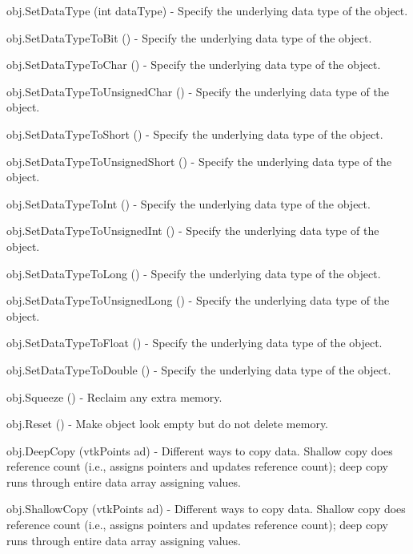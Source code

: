 \begin{DoxyItemize}
\item {\ttfamily obj.\-Set\-Data\-Type (int data\-Type)} -\/ Specify the underlying data type of the object.  
\item {\ttfamily obj.\-Set\-Data\-Type\-To\-Bit ()} -\/ Specify the underlying data type of the object.  
\item {\ttfamily obj.\-Set\-Data\-Type\-To\-Char ()} -\/ Specify the underlying data type of the object.  
\item {\ttfamily obj.\-Set\-Data\-Type\-To\-Unsigned\-Char ()} -\/ Specify the underlying data type of the object.  
\item {\ttfamily obj.\-Set\-Data\-Type\-To\-Short ()} -\/ Specify the underlying data type of the object.  
\item {\ttfamily obj.\-Set\-Data\-Type\-To\-Unsigned\-Short ()} -\/ Specify the underlying data type of the object.  
\item {\ttfamily obj.\-Set\-Data\-Type\-To\-Int ()} -\/ Specify the underlying data type of the object.  
\item {\ttfamily obj.\-Set\-Data\-Type\-To\-Unsigned\-Int ()} -\/ Specify the underlying data type of the object.  
\item {\ttfamily obj.\-Set\-Data\-Type\-To\-Long ()} -\/ Specify the underlying data type of the object.  
\item {\ttfamily obj.\-Set\-Data\-Type\-To\-Unsigned\-Long ()} -\/ Specify the underlying data type of the object.  
\item {\ttfamily obj.\-Set\-Data\-Type\-To\-Float ()} -\/ Specify the underlying data type of the object.  
\item {\ttfamily obj.\-Set\-Data\-Type\-To\-Double ()} -\/ Specify the underlying data type of the object.  
\item {\ttfamily obj.\-Squeeze ()} -\/ Reclaim any extra memory.  
\item {\ttfamily obj.\-Reset ()} -\/ Make object look empty but do not delete memory.  
\item {\ttfamily obj.\-Deep\-Copy (vtk\-Points ad)} -\/ Different ways to copy data. Shallow copy does reference count (i.\-e., assigns pointers and updates reference count); deep copy runs through entire data array assigning values.  
\item {\ttfamily obj.\-Shallow\-Copy (vtk\-Points ad)} -\/ Different ways to copy data. Shallow copy does reference count (i.\-e., assigns pointers and updates reference count); deep copy runs through entire data array assigning values.  

\end{DoxyItemize}
